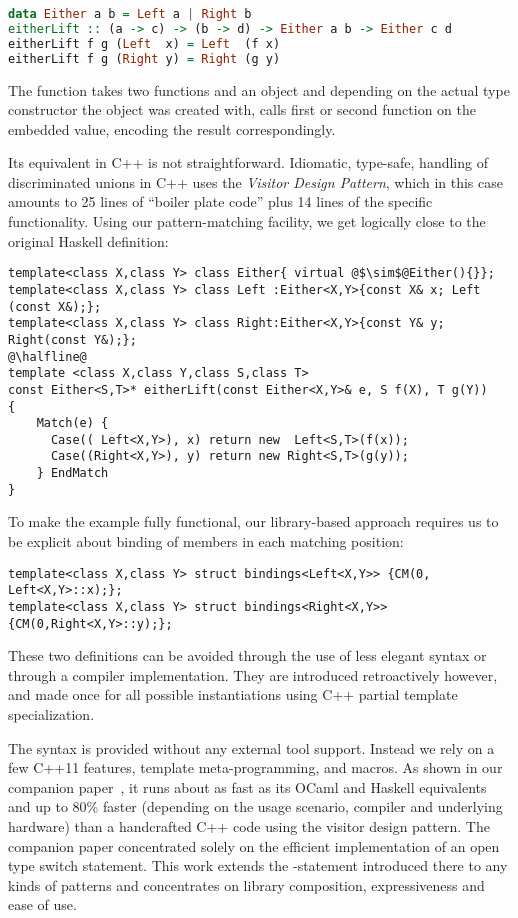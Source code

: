 \begin{lstlisting}[language=Haskell,keepspaces]
data Either a b = Left a | Right b
eitherLift :: (a -> c) -> (b -> d) -> Either a b -> Either c d
eitherLift f g (Left  x) = Left  (f x)
eitherLift f g (Right y) = Right (g y)
\end{lstlisting}

\noindent
The function  takes two functions and an 
object and depending on the actual type constructor the object was created with, 
calls first or second function on the embedded value, encoding the result 
correspondingly.

Its equivalent in C++ is not straightforward. Idiomatic, type-safe, handling of 
discriminated unions in C++ uses the \emph{Visitor Design Pattern}\cite{DesignPatterns}, 
which in this case amounts to 25 lines of ``boiler plate code'' plus 14 lines 
of the specific functionality. Using our 
pattern-matching facility, we get logically close to the original Haskell definition:

\begin{lstlisting}[keepspaces,columns=flexible]
template<class X,class Y> class Either{ virtual @$\sim$@Either(){}};
template<class X,class Y> class Left :Either<X,Y>{const X& x; Left (const X&);};
template<class X,class Y> class Right:Either<X,Y>{const Y& y; Right(const Y&);};
@\halfline@
template <class X,class Y,class S,class T>
const Either<S,T>* eitherLift(const Either<X,Y>& e, S f(X), T g(Y))
{
    Match(e) {
      Case(( Left<X,Y>), x) return new  Left<S,T>(f(x));
      Case((Right<X,Y>), y) return new Right<S,T>(g(y));
    } EndMatch
}
\end{lstlisting}

\noindent
To make the example fully functional, our library-based approach requires us to 
be explicit about binding of members in each matching position:

\begin{lstlisting}[keepspaces,columns=flexible]
template<class X,class Y> struct bindings<Left<X,Y>> {CM(0, Left<X,Y>::x);};
template<class X,class Y> struct bindings<Right<X,Y>>{CM(0,Right<X,Y>::y);};
\end{lstlisting}

\noindent
These two definitions can be avoided through the use of less elegant syntax
or through a compiler implementation.
They are introduced retroactively however, and made once for all 
possible instantiations using C++ partial template specialization. 

The syntax is provided without any external tool support. Instead we rely on a 
few C++11 features\cite{C++11}, template meta-programming, and macros. As shown 
in our companion paper~\cite{TypeSwitch}, it runs about as fast as its OCaml and 
Haskell equivalents and up to 80\% faster (depending on the usage scenario, 
compiler and underlying hardware) than a handcrafted C++ code using the visitor 
design pattern. The companion paper concentrated solely on the efficient 
implementation of an open type switch statement. This work extends the 
-statement introduced there to any kinds of patterns and 
concentrates on library composition, expressiveness and ease of use.

